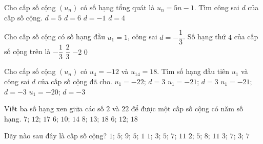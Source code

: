 \begin{ex}%
	Cho cấp số cộng $\left(u_n\right)$ có số hạng tổng quát là  $u_n=5n-1$. Tìm công sai $d$ của cấp số cộng.
	\choice 
		{\True $d=5$} 
		 {$d=6$}
		 {$d=-1$}
		 {$d=4$}
\end{ex}

\begin{ex}%
	Cho cấp số cộng có số hạng đầu $u_1=1$, công sai $d=-\dfrac{1}{3}$. Số hạng thứ $4$ của cấp số cộng  trên là
	 \choice
		{$-\dfrac{1}{3}$} 
		 {$\dfrac{2}{3}$}
		{$-2$} 
		{\True  $0$}
\end{ex}

\begin{ex}%
	Cho cấp số cộng $(u_n)$ có $u_4=-12$ và $u_{14}=18$. Tìm số hạng đầu tiên $u_1$ và công sai $d$ của cấp số cộng đã  cho.
	\choice 
		{$u_1=-22$;  $d=3$}
		{\True $u_1=-21$;  $d=3$}
		{  $u_1=-21$; $d=-3$}
		{ $u_1=-20$;  $d=-3$}
\end{ex}

\begin{ex}%
	Viết ba số hạng  xen giữa các số $2$ và $22$ để được một cấp số cộng có năm số hạng.
	\choice 
		{\True $7$; $12$;  $17$}
		{$6$;  $10$; $14$}
		{$8$; $13$;  $18$}
		{$6$; $12$; $18$} 
\end{ex}

\begin{ex}%
	Dãy nào sau đây là cấp  số cộng?
	\choice 
		{$1$; $5$;  $9$; $5$; $1$}
		{$1$; $3$;  $5$; $7$; $11$}
		{\True $2$; $5$;  $8$; $11$}
		{$3$; $7$; $3$; $7$} 
\end{ex}

